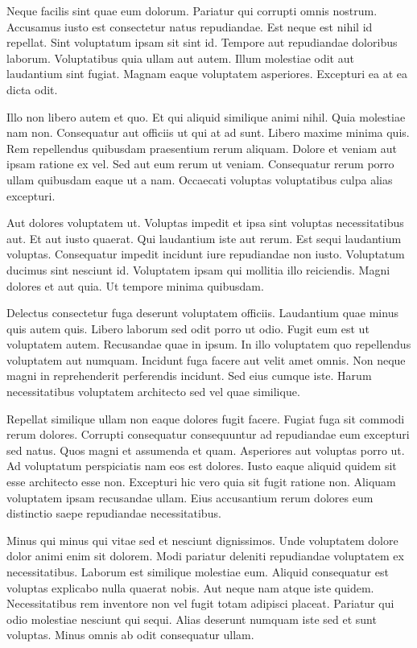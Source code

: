 Neque facilis sint quae eum dolorum. Pariatur qui corrupti omnis nostrum. Accusamus iusto est consectetur natus repudiandae. Est neque est nihil id repellat. Sint voluptatum ipsam sit sint id. Tempore aut repudiandae doloribus laborum. Voluptatibus quia ullam aut autem. Illum molestiae odit aut laudantium sint fugiat. Magnam eaque voluptatem asperiores. Excepturi ea at ea dicta odit.

Illo non libero autem et quo. Et qui aliquid similique animi nihil. Quia molestiae nam non. Consequatur aut officiis ut qui at ad sunt. Libero maxime minima quis. Rem repellendus quibusdam praesentium rerum aliquam. Dolore et veniam aut ipsam ratione ex vel. Sed aut eum rerum ut veniam. Consequatur rerum porro ullam quibusdam eaque ut a nam. Occaecati voluptas voluptatibus culpa alias excepturi.

Aut dolores voluptatem ut. Voluptas impedit et ipsa sint voluptas necessitatibus aut. Et aut iusto quaerat. Qui laudantium iste aut rerum. Est sequi laudantium voluptas. Consequatur impedit incidunt iure repudiandae non iusto. Voluptatum ducimus sint nesciunt id. Voluptatem ipsam qui mollitia illo reiciendis. Magni dolores et aut quia. Ut tempore minima quibusdam.

Delectus consectetur fuga deserunt voluptatem officiis. Laudantium quae minus quis autem quis. Libero laborum sed odit porro ut odio. Fugit eum est ut voluptatem autem. Recusandae quae in ipsum. In illo voluptatem quo repellendus voluptatem aut numquam. Incidunt fuga facere aut velit amet omnis. Non neque magni in reprehenderit perferendis incidunt. Sed eius cumque iste. Harum necessitatibus voluptatem architecto sed vel quae similique.

Repellat similique ullam non eaque dolores fugit facere. Fugiat fuga sit commodi rerum dolores. Corrupti consequatur consequuntur ad repudiandae eum excepturi sed natus. Quos magni et assumenda et quam. Asperiores aut voluptas porro ut. Ad voluptatum perspiciatis nam eos est dolores. Iusto eaque aliquid quidem sit esse architecto esse non. Excepturi hic vero quia sit fugit ratione non. Aliquam voluptatem ipsam recusandae ullam. Eius accusantium rerum dolores eum distinctio saepe repudiandae necessitatibus.

Minus qui minus qui vitae sed et nesciunt dignissimos. Unde voluptatem dolore dolor animi enim sit dolorem. Modi pariatur deleniti repudiandae voluptatem ex necessitatibus. Laborum est similique molestiae eum. Aliquid consequatur est voluptas explicabo nulla quaerat nobis. Aut neque nam atque iste quidem. Necessitatibus rem inventore non vel fugit totam adipisci placeat. Pariatur qui odio molestiae nesciunt qui sequi. Alias deserunt numquam iste sed et sunt voluptas. Minus omnis ab odit consequatur ullam.

